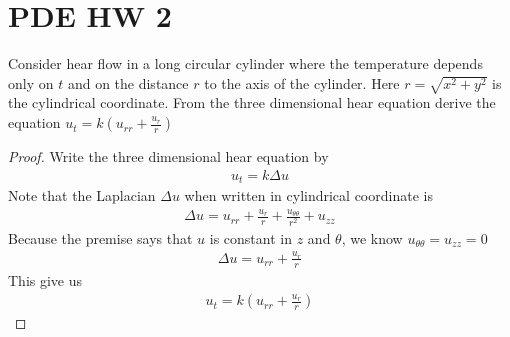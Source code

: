\documentclass{report}
\begin{document}
\section{PDE HW 2}
\begin{question}{}{}
Consider hear flow in a long circular cylinder where the temperature depends only on $t$ and on the distance $r$ to the axis of the cylinder. Here $r=\sqrt{x^2+y^2}$ is the cylindrical coordinate. From the three dimensional hear equation derive the equation $u_t=k (u_{rr}+\frac{u_r}{r})$
\end{question}
\begin{proof}
Write the three dimensional hear equation by 
\begin{align*}
u_t= k \Delta u
\end{align*}
Note that the Laplacian $\Delta u$ when written in cylindrical coordinate is 
\begin{align*}
\Delta u= u_{rr} + \frac{u_r}{r} +\frac{u_{\theta \theta}}{r^2} + u_{zz}
\end{align*}
Because the premise says that $u$ is constant in $z$ and  $\theta$, we know $u_{\theta \theta}=u_{zz}=0$
\begin{align*}
\Delta u = u_{rr}+ \frac{u_r}{r}
\end{align*}
This give us 
\begin{align*}
u_t= k (u_{rr}+ \frac{u_r}{r})
\end{align*}
\end{proof}
\end{document}
